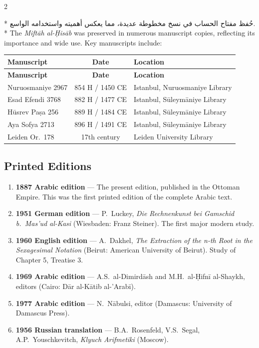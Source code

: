 \documentclass[11pt,a4paper]{article}
\newcommand{\ar}[1]{\arabicfont\beginR #1\endR}
\newenvironment{bilingual}{%
  \vspace{0.3em}%
  \begin{paracol}{2}%
}{%
  \end{paracol}%
  \vspace{0.3em}%
}
\begin{document}
\begin{bilingual}
\switchcolumn[0]*
\ar{حُفظ مفتاح الحساب في نسخ مخطوطة عديدة، مما يعكس أهميته واستخدامه الواسع.}
\switchcolumn[1]*
The \textit{Mift\=ah al-\d{H}is\=ab} was preserved in numerous manuscript
copies, reflecting its importance and wide use. Key manuscripts
include:
\end{bilingual}

\begin{longtable}{|l|c|l|}
\hline
\textbf{Manuscript} & \textbf{Date} & \textbf{Location} \\
\hline
\endfirsthead
\hline
\textbf{Manuscript} & \textbf{Date} & \textbf{Location} \\
\hline
\endhead
Nuruosmaniye 2967 & 854 H / 1450 CE & Istanbul, Nuruosmaniye Library
\\
\hline
Esad Efendi 3768 & 882 H / 1477 CE & Istanbul, S\=uleym\=aniye Library \\
\hline
H\=usrev Pa\d{s}a 256 & 889 H / 1484 CE & Istanbul, S\=uleym\=aniye Library \\
\hline
Aya Sofya 2713 & 896 H / 1491 CE & Istanbul, S\=uleym\=aniye Library \\
\hline
Leiden Or.\ 178 & 17th century & Leiden University Library \\
\hline
\end{longtable}

\subsection{Printed Editions}

\begin{enumerate}[label=\arabic*.]
  \item \textbf{1887 Arabic edition} --- The present edition, published in
  the Ottoman Empire. This was the first printed edition of the
  complete Arabic text.
  \item \textbf{1951 German edition} --- P.\ Luckey, \textit{Die
  Rechnenkunst bei Gamschid b.\ Mas'ud al-Kasi} (Wiesbaden: Franz
  Steiner). The first major modern study.
  \item \textbf{1960 English edition} --- A.\ Dakhel, \textit{The Extraction
  of the n-th Root in the Sexagesimal Notation} (Beirut: American
  University of Beirut). Study of Chapter 5, Treatise 3.
  \item \textbf{1969 Arabic edition} --- A.S.\ al-Dimird\=ash and
  M.H.\ al-\d{H}ifn\=i al-Shaykh, editors (Cairo: D\=ar al-K\=atib al-'Arab\=i).
  \item \textbf{1977 Arabic edition} --- N.\ N\=abulsi, editor (Damascus:
  University of Damascus Press).
  \item \textbf{1956 Russian translation} --- B.A.\ Rosenfeld, V.S.\ Segal,
  A.P.\ Youschkevitch, \textit{Klyuch Arifmetiki} (Moscow).
\end{enumerate}
\end{document}
